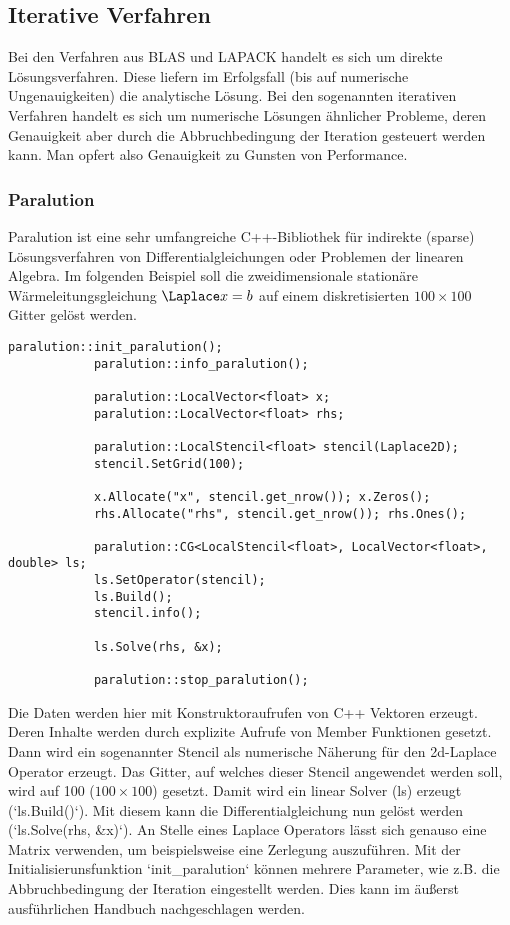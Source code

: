 		\subsection{Iterative Verfahren}
		Bei den Verfahren aus BLAS und LAPACK handelt es sich um direkte Lösungsverfahren. Diese liefern im Erfolgsfall (bis auf numerische Ungenauigkeiten) die analytische Lösung. Bei den sogenannten iterativen Verfahren handelt es sich um numerische Lösungen ähnlicher Probleme, deren Genauigkeit aber durch die Abbruchbedingung der Iteration gesteuert werden kann. Man opfert also Genauigkeit zu Gunsten von Performance. 
		
			\subsubsection{Paralution}
			Paralution ist eine sehr umfangreiche C++-Bibliothek für indirekte (sparse) Lösungsverfahren von Differentialgleichungen oder Problemen der linearen Algebra. Im folgenden Beispiel soll die zweidimensionale stationäre Wärmeleitungsgleichung $\Laplace x = b$ auf einem diskretisierten $100\times 100$ Gitter gelöst werden.
			\begin{lstlisting}[caption=Paralution Beispiel]		
			paralution::init_paralution();
			paralution::info_paralution();

			paralution::LocalVector<float> x;
			paralution::LocalVector<float> rhs;

			paralution::LocalStencil<float> stencil(Laplace2D);
			stencil.SetGrid(100);

			x.Allocate("x", stencil.get_nrow()); x.Zeros();
			rhs.Allocate("rhs", stencil.get_nrow()); rhs.Ones();

			paralution::CG<LocalStencil<float>, LocalVector<float>, double> ls;
			ls.SetOperator(stencil);
			ls.Build();
			stencil.info();

			ls.Solve(rhs, &x);

			paralution::stop_paralution();
			\end{lstlisting}
			
			Die Daten werden hier mit Konstruktoraufrufen von C++ Vektoren erzeugt. Deren Inhalte werden durch explizite Aufrufe von Member Funktionen gesetzt. Dann wird ein sogenannter Stencil als numerische Näherung für den 2d-Laplace Operator erzeugt. Das Gitter, auf welches dieser Stencil angewendet werden soll, wird auf 100 ($100\times 100$) gesetzt. Damit wird ein linear Solver (ls) erzeugt (\li`ls.Build()`). Mit diesem kann die Differentialgleichung nun gelöst werden (\li`ls.Solve(rhs, &x)`). An Stelle eines Laplace Operators lässt sich genauso eine Matrix verwenden, um beispielsweise eine Zerlegung auszuführen. Mit der Initialisierunsfunktion \li`init_paralution` können mehrere Parameter, wie z.B. die Abbruchbedingung der Iteration eingestellt werden. Dies kann im äußerst ausführlichen Handbuch nachgeschlagen werden. \autocite{para}
			 
